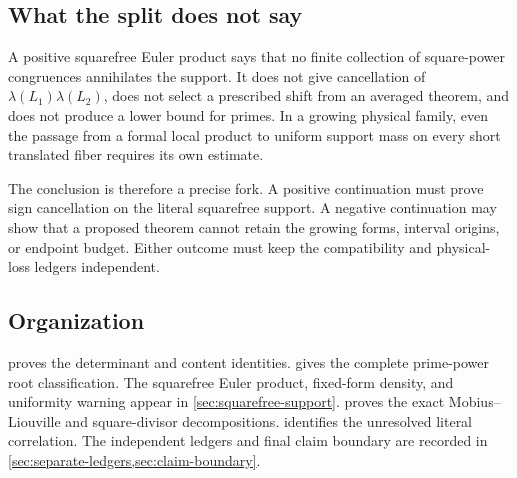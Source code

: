 \subsection{What the split does not say}

A positive squarefree Euler product says that no finite collection
of square-power congruences annihilates the support.  It does not
give cancellation of \(\lambda(L_1)\lambda(L_2)\), does not select a
prescribed shift from an averaged theorem, and does not produce a
lower bound for primes.  In a growing physical family, even the
passage from a formal local product to uniform support mass on every
short translated fiber requires its own estimate.

The conclusion is therefore a precise fork.  A positive continuation
must prove sign cancellation on the literal squarefree support.  A
negative continuation may show that a proposed theorem cannot retain
the growing forms, interval origins, or endpoint budget.  Either
outcome must keep the compatibility and physical-loss ledgers
independent.

\subsection{Organization}

 proves the determinant and content
identities.   gives the complete
prime-power root classification.  The squarefree Euler product,
fixed-form density, and uniformity warning appear in
\cref{sec:squarefree-support}.   proves the
exact Mobius--Liouville and square-divisor decompositions.
 identifies the unresolved literal
correlation.  The independent ledgers and final claim boundary are
recorded in \cref{sec:separate-ledgers,sec:claim-boundary}.
